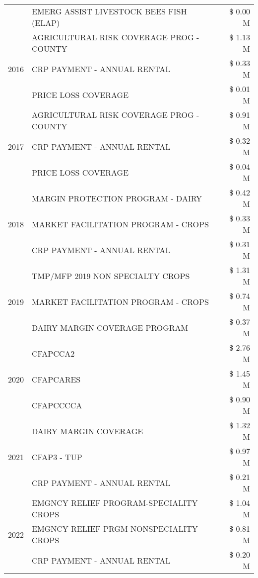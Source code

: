 \begin{tabular}{llr}
 & EMERG ASSIST LIVESTOCK BEES FISH (ELAP) & \$ 0.00 M \\
\cline{1-3}
\multirow[t]{3}{*}{2016} & AGRICULTURAL RISK COVERAGE PROG - COUNTY & \$ 1.13 M \\
 & CRP PAYMENT - ANNUAL RENTAL & \$ 0.33 M \\
 & PRICE LOSS COVERAGE & \$ 0.01 M \\
\cline{1-3}
\multirow[t]{3}{*}{2017} & AGRICULTURAL RISK COVERAGE PROG - COUNTY & \$ 0.91 M \\
 & CRP PAYMENT - ANNUAL RENTAL & \$ 0.32 M \\
 & PRICE LOSS COVERAGE & \$ 0.04 M \\
\cline{1-3}
\multirow[t]{3}{*}{2018} & MARGIN PROTECTION PROGRAM - DAIRY & \$ 0.42 M \\
 & MARKET FACILITATION PROGRAM - CROPS & \$ 0.33 M \\
 & CRP PAYMENT - ANNUAL RENTAL & \$ 0.31 M \\
\cline{1-3}
\multirow[t]{3}{*}{2019} & TMP/MFP 2019 NON SPECIALTY CROPS & \$ 1.31 M \\
 & MARKET FACILITATION PROGRAM - CROPS & \$ 0.74 M \\
 & DAIRY MARGIN COVERAGE PROGRAM & \$ 0.37 M \\
\cline{1-3}
\multirow[t]{3}{*}{2020} & CFAPCCA2 & \$ 2.76 M \\
 & CFAPCARES & \$ 1.45 M \\
 & CFAPCCCCA & \$ 0.90 M \\
\cline{1-3}
\multirow[t]{3}{*}{2021} & DAIRY MARGIN COVERAGE & \$ 1.32 M \\
 & CFAP3 - TUP & \$ 0.97 M \\
 & CRP PAYMENT - ANNUAL RENTAL & \$ 0.21 M \\
\cline{1-3}
\multirow[t]{3}{*}{2022} & EMGNCY RELIEF PROGRAM-SPECIALITY CROPS & \$ 1.04 M \\
 & EMGNCY RELIEF PRGM-NONSPECIALITY CROPS & \$ 0.81 M \\
 & CRP PAYMENT - ANNUAL RENTAL & \$ 0.20 M \\
\cline{1-3}
\bottomrule
\end{tabular}
